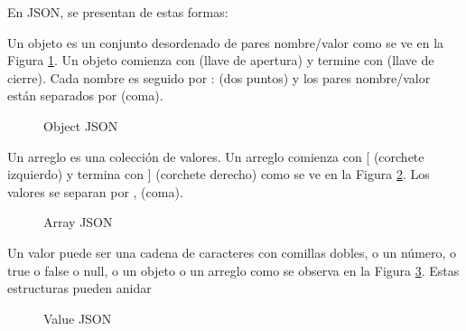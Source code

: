 En JSON, se presentan de estas formas:


Un objeto es un conjunto desordenado de pares nombre/valor como se ve en la Figura \ref{fig:objectJSON}. Un objeto comienza con { (llave de apertura) y termine con } (llave de cierre). Cada nombre es seguido por : (dos puntos) y los pares nombre/valor están separados por (coma).
\begin{figure}[H]
\centering
{}
\caption{Object JSON} \label{fig:objectJSON}
\end{figure}

Un arreglo es una colecci\'on de valores. Un arreglo comienza con [ (corchete izquierdo) y termina con ] (corchete derecho) como se ve en la Figura \ref{fig:arrayJSON}. Los valores se separan por , (coma).

\begin{figure}[H]
\centering
{}
\caption{Array JSON} \label{fig:arrayJSON}
\end{figure}

Un valor puede ser una cadena de caracteres con comillas dobles, o un n\'umero, o true o false o null, o un objeto o un arreglo como se observa en la Figura \ref{fig:valueJSON}. Estas estructuras pueden anidar

\begin{figure}[H]
\centering
{}
\caption{Value JSON} \label{fig:valueJSON}
\end{figure}

